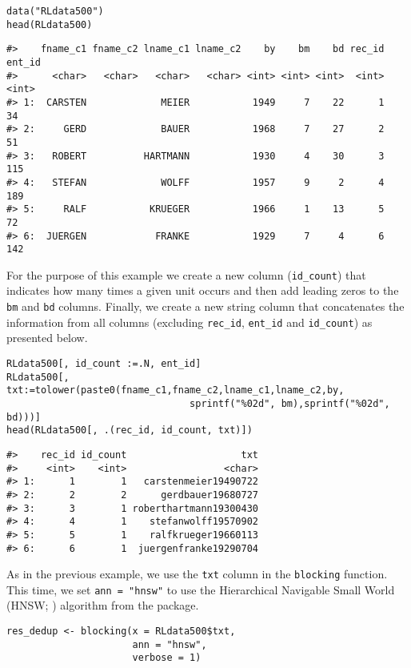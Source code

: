\begin{verbatim}
data("RLdata500")
head(RLdata500)
\end{verbatim}

\begin{verbatim}
#>    fname_c1 fname_c2 lname_c1 lname_c2    by    bm    bd rec_id ent_id
#>      <char>   <char>   <char>   <char> <int> <int> <int>  <int>  <int>
#> 1:  CARSTEN             MEIER           1949     7    22      1     34
#> 2:     GERD             BAUER           1968     7    27      2     51
#> 3:   ROBERT          HARTMANN           1930     4    30      3    115
#> 4:   STEFAN             WOLFF           1957     9     2      4    189
#> 5:     RALF           KRUEGER           1966     1    13      5     72
#> 6:  JUERGEN            FRANKE           1929     7     4      6    142
\end{verbatim}

For the purpose of this example we create a new column (\texttt{id\_count}) that indicates
how many times a given unit occurs and then add leading zeros to the \texttt{bm} and \texttt{bd}
columns. Finally, we create a new string column that concatenates the
information from all columns (excluding \texttt{rec\_id}, \texttt{ent\_id} and
\texttt{id\_count}) as presented below.

\begin{verbatim}
RLdata500[, id_count :=.N, ent_id]
RLdata500[, txt:=tolower(paste0(fname_c1,fname_c2,lname_c1,lname_c2,by,
                                sprintf("%02d", bm),sprintf("%02d", bd)))]
head(RLdata500[, .(rec_id, id_count, txt)])
\end{verbatim}

\begin{verbatim}
#>    rec_id id_count                    txt
#>     <int>    <int>                 <char>
#> 1:      1        1   carstenmeier19490722
#> 2:      2        2      gerdbauer19680727
#> 3:      3        1 roberthartmann19300430
#> 4:      4        1    stefanwolff19570902
#> 5:      5        1    ralfkrueger19660113
#> 6:      6        1  juergenfranke19290704
\end{verbatim}

As in the previous example, we use the \texttt{txt} column in the \texttt{blocking}
function. This time, we set \texttt{ann\ =\ "hnsw"} to use the Hierarchical
Navigable Small World (HNSW; \citet{malkov2018efficient}) algorithm from the 
package.

\begin{verbatim}
res_dedup <- blocking(x = RLdata500$txt,
                      ann = "hnsw",
                      verbose = 1)
\end{verbatim}

